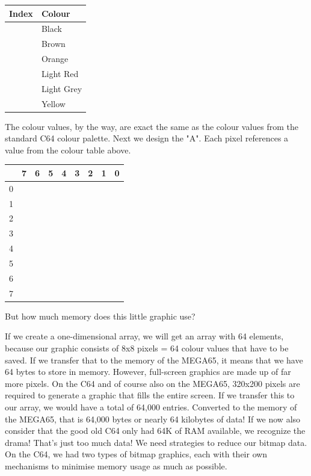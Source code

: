 \begin{center}
\begin{tabular}{|l|l|}
\hline
	Index & Colour \\
\hline
	\blkb & Black \\
	\bwn & Brown \\
	\ora & Orange \\
	\red & Light Red \\
	\lgr & Light Grey \\
	\yel & Yellow \\
\hline
\end{tabular}
\end{center}

The colour values, by the way, are exact the same as the colour values from the standard C64 colour palette. Next we design the "A". Each pixel references a value from the colour table above.


\begin{center}
\begin{tabular}{|m{6pt}|m{6pt}m{6pt}m{6pt}m{6pt}m{6pt}m{5pt}m{6pt}m{6pt}|}
\hline
	& 7 & 6 & 5 & 4 & 3 & 2 & 1 & 0 \\
\hline
	0 & \blkb & \blkb & \blkb & \blkb & \blkb & \blkb & \blkb & \blkb \\
	1 & \red & \lgr & \yel & \lgr & \red & \ora & \blkb & \blkb \\
	2 & \lgr & \lgr & \blkb & \blkb & \ora & \red & \blkb & \blkb \\
	3 & \yel & \yel & \blkb & \blkb & \ora & \red & \blkb & \blkb \\
	4 & \yel & \lgr & \lgr & \red & \red & \red & \blkb & \blkb \\
	5 & \lgr & \red & \blkb & \blkb & \ora & \red & \blkb & \blkb \\
	6 & \red & \red & \blkb & \blkb & \red & \red & \blkb & \blkb \\
	7 & \ora & \bwn & \blkb & \blkb & \ora & \red & \blkb & \blkb \\
\hline
\end{tabular}
\end{center}

But how much memory does this little graphic use?

If we create a one-dimensional array, we will get an array with 64 elements, because our graphic consists of 8x8 pixels = 64 colour values that have to be saved. If we transfer that to the memory of the MEGA65, it means that we have 64 bytes to store in memory. However, full-screen graphics are made up of far more pixels. On the C64 and of course also on the MEGA65, 320x200 pixels are required to generate a graphic that fills the entire screen. If we transfer this to our array, we would have a total of 64,000 entries. Converted to the memory of the MEGA65, that is 64,000 bytes or nearly 64 kilobytes of data! If we now also consider that the good old C64 only had 64K of RAM available, we recognize the drama! That's just too much data! We need strategies to reduce our bitmap data. On the C64, we had two types of bitmap graphics, each with their own mechanisms to minimise memory usage as much as possible.

